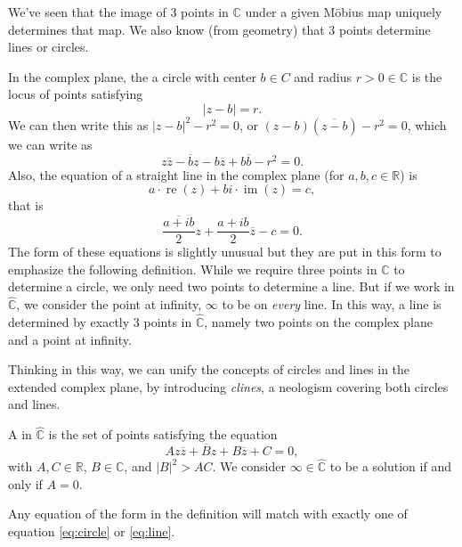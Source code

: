 \documentclass[a4paper]{scrartcl}
\begin{document}
We've seen that the image of 3 points in $\mathbb{C}$ under a given Möbius map uniquely determines that map. We also know (from geometry) that 3 points determine lines or circles. 

In the complex plane, the a circle with center $b \in C$ and radius $r > 0 \in \mathbb{C}$ is the locus of points satisfying
$$
|z - b| = r.
$$
We can then write this as $|z - b|^2 - r^2 = 0$, or $(z - b)(\overline{z - b}) - r^2 = 0$, which we can write as
\begin{equation}\label{eq:circle}
	z \overline{z} - \overline{b}z - b \overline{z} + b \overline{b} - r^2 = 0.
	\tag{$*$}
\end{equation}
Also, the equation of a straight line in the complex plane (for $a, b, c \in \mathbb{R}$) is
$$
	a \cdot \operatorname{re}(z) + bi \cdot \operatorname{im}(z) = c,
$$
that is
\begin{equation}\label{eq:line}
\frac{\overline{a + i b}}{2}z + \frac{a + ib}{2} \overline{z} - c = 0.
\tag{$\dagger$}	
\end{equation}
The form of these equations is slightly unusual but they are put in this form to emphasize the following definition.
While we require three points in $\mathbb{C}$ to determine a circle, we only need two points to determine a line. But if we work in $\hat{\mathbb{C}}$, we consider the point at infinity, $\infty$ to be on \emph{every} line. In this way, a line is determined by exactly 3 points in $\hat{\mathbb{C}}$, namely two points on the complex plane and a point at infinity.

Thinking in this way, we can unify the concepts of circles and lines in the extended complex plane, by introducing \emph{clines}, a neologism covering both circles and lines. 

\begin{definition}
A  in $\hat{\mathbb{C}}$ is the set of points satisfying the equation
$$
A z \overline{z} + \overline{B}z + B \overline{z} + C = 0,
$$
with $A, C \in \mathbb{R}$, $B \in \mathbb{C}$, and $|B|^2 > AC$. We consider $\infty \in \hat{\mathbb{C}}$ to be a solution if and only if $A = 0$.  
\end{definition}

Any equation of the form in the definition will match with exactly one of equation \eqref{eq:circle} or \eqref{eq:line}.
\end{document}

